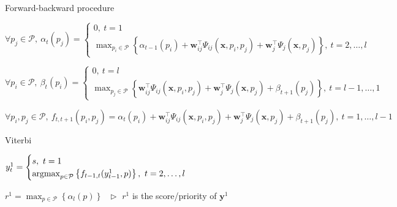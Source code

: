 \begin{algorithm}[htbp]
\caption{Forward-backward procedure~\cite{rabiner1989tutorial}}
\label{alg:forward-backward}
\begin{algorithmic}[1]
  \STATE $\forall p_j \in \mathcal{P},~ \alpha_t(p_j) =
          \begin{cases}
          0,~ t = 1 \\
          \max_{p_i \in \mathcal{P}} \left\{ \alpha_{t-1}(p_i) + \mathbf{w}_{ij}^\top \Psi_{ij}(\mathbf{x}, p_i, p_j) +
          \mathbf{w}_j^\top \Psi_j(\mathbf{x}, p_j) \right\},~ t=2,\dots,l
          \end{cases}$

  \STATE $\forall p_i \in \mathcal{P},~ \beta_t(p_i) =
          \begin{cases}
          0,~ t = l \\
          \max_{p_j \in \mathcal{P}} \left\{ \mathbf{w}_{ij}^\top \Psi_{ij}(\mathbf{x}, p_i, p_j) +
          \mathbf{w}_j^\top \Psi_j(\mathbf{x}, p_j) + \beta_{t+1}(p_j) \right\},~ t = l-1,\dots,1
          \end{cases}$

  \STATE $\forall p_i, p_j \in \mathcal{P},~ f_{t,t+1}(p_i, p_j) = \alpha_t(p_i) + \mathbf{w}_{ij}^\top \Psi_{ij}(\mathbf{x}, p_i, p_j) +
                                \mathbf{w}_j^\top \Psi_j(\mathbf{x}, p_j) + \beta_{t+1}(p_j),~ t = 1,\dots,l-1$
\end{algorithmic}
\end{algorithm}

\begin{algorithm}[htbp]
\caption{Viterbi}
\label{alg:viterbi}
\begin{algorithmic}[1]
  \STATE $y_t^1 = \begin{cases}
                  s,~ t = 1 \\
                  \operatorname*{argmax}_{p \in \mathcal{P}} \left\{ f_{t-1,t}(y_{t-1}^1, p) \right\},~ t = 2,\dots,l
                  \end{cases}$

  \STATE $r^1 = \max_{p \in \mathcal{P}} \left\{ \alpha_{l}(p) \right\}~~~ \triangleright$ $r^1$ is the score/priority of $\mathbf{y}^1$
\end{algorithmic}
\end{algorithm}

